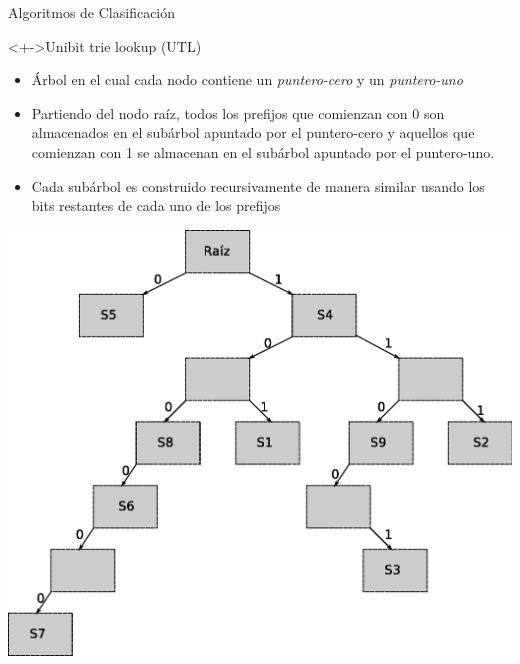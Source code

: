 \documentclass[xcolor=dvipsnames]{beamer}
\begin{document}
\begin{frame}{Algoritmos de Clasificación}
  \begin{block}<+->{Unibit trie lookup (UTL)}   
    \begin{itemize}
      \scriptsize
     	\item Árbol en el cual cada nodo contiene un \textit{puntero-cero }y un \textit{puntero-uno}
	\item Partiendo del nodo raíz, todos los prefijos que comienzan con 0 son almacenados en el subárbol apuntado por el puntero-cero y aquellos que comienzan con 1 se almacenan en el subárbol apuntado por el puntero-uno.
	\item Cada subárbol es construido recursivamente de manera similar usando los bits restantes de cada uno de los prefijos
    \end{itemize}
\centering 
\includegraphics[scale=0.25]{figures/trie.eps}	
  \end{block}
\end{frame}

\end{document}

